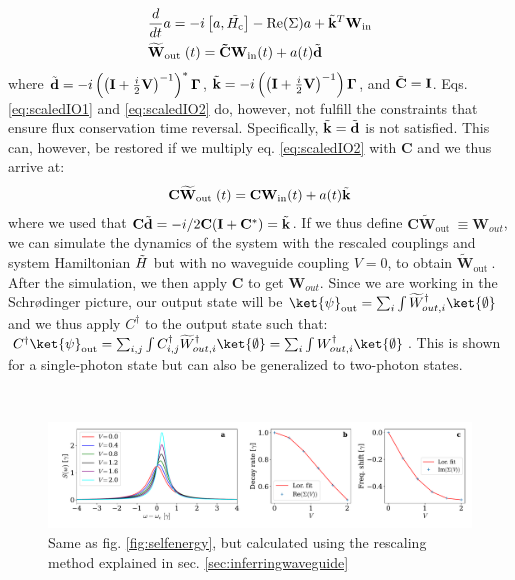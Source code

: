 \begin{align}
& \frac{d}{d t} a= -i\left[a, \Tilde{H_{\mathrm{c}}} \right] -\mathrm{Re}(\Sigma) a + \Tilde{\mathbf{k}}^T \mathbf{W}_{\mathrm{in}} \label{eq:scaledIO1} \\
& \widetilde{\mathbf{W}}_{\text {out }}(t)= \mathbf{\Tilde{C}} \mathbf{W}_{\mathrm{in}}(t)+a(t)\Tilde{\mathbf{d}} \label{eq:scaledIO2}
\end{align}
where $\Tilde{\mathbf{d}} = -i \left(\left(\mathbf{I}+\frac{i}{2} \mathbf{V}\right)^{-1} \right)^* \mathbf{\Gamma}$, $\Tilde{\mathbf{k}} = -i \left(\left(\mathbf{I}+\frac{i}{2} \mathbf{V}\right)^{-1} \right) \mathbf{\Gamma}$, and $\Tilde{\mathbf{C}} = \mathbf{I}$. Eqs. \eqref{eq:scaledIO1} and \eqref{eq:scaledIO2} do, however, not fulfill the constraints that ensure flux conservation time reversal. Specifically, $\Tilde{\mathbf{k}} = \Tilde{\mathbf{d}}$ is not satisfied. This can, however, be restored if we multiply eq. \eqref{eq:scaledIO2} with $\mathbf{C}$ and we thus arrive at:
\begin{align}
\mathbf{C} \widetilde{\mathbf{W}}_{\text {out }}(t)= \mathbf{C} \mathbf{W}_{\mathrm{in}}(t)+a(t)\Tilde{\mathbf{k}}
\end{align}
where we used that $\mathbf{C} \Tilde{\mathbf{d}} = - i/2 \mathbf{C} (\mathbf{I}+\mathbf{C}^*) = \Tilde{\mathbf{k}}$. If we thus define $\mathbf{C} \widetilde{\mathbf{W}}_{\text {out }} \equiv \mathbf{W}_{out}$, we can simulate the dynamics of the system with the rescaled couplings and system Hamiltonian $\Tilde{H}$ but with no waveguide coupling $V=0$, to obtain $\widetilde{\mathbf{W}}_{\text {out }}$. After the simulation, we then apply $\mathbf{C}$ to get $\mathbf{W}_{out}$. Since we are working in the Schr{\o}dinger picture, our output state will be $\ket{\psi}_{\mathrm{out}} = \sum_i \int \widetilde{W}_{out,i}^\dagger \ket{\emptyset}$ and we thus apply $C^\dagger$ to the output state such that: $C^\dagger \ket{\psi}_{\mathrm{out}} = \sum_{i,j} \int C_{i,j}^\dagger \widetilde{W}_{out,i}^\dagger \ket{\emptyset} = \sum_i \int W_{out,i}^\dagger \ket{\emptyset}$. This is shown for a single-photon state but can also be generalized to two-photon states.

\

\begin{figure}
    \centering
    \includegraphics[width = \linewidth]{figures/fanoressonanceIO.pdf}
    \caption{Same as fig. \ref{fig:selfenergy}, but calculated using the rescaling method explained in sec. \ref{sec:inferringwaveguide}}
    \label{fig:DecayIO}
\end{figure}

